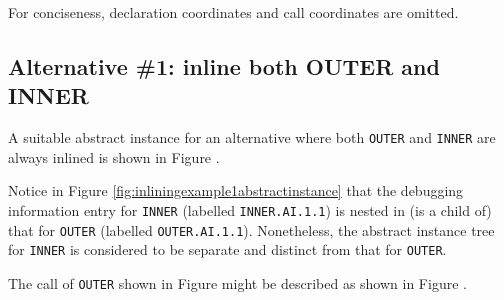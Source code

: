 For conciseness, declaration coordinates and call coordinates are omitted.

\subsection{Alternative \#1: inline both OUTER and INNER}
\label{app:inlinebothouterandinner}

A suitable abstract instance for an alternative where both
\texttt{OUTER} and \texttt{INNER} are always inlined is shown in 
Figure .

Notice in 
Figure \ref{fig:inliningexample1abstractinstance} 
that the debugging information entry for
\texttt{INNER} (labelled \texttt{INNER.AI.1.1}) is nested in (is a child of)
that for \texttt{OUTER} (labelled \texttt{OUTER.AI.1.1}). Nonetheless, the
abstract instance tree for \texttt{INNER} is considered to be separate
and distinct from that for \texttt{OUTER}.

The call of \texttt{OUTER} shown in 
Figure 
might be described as
shown in 
Figure .


